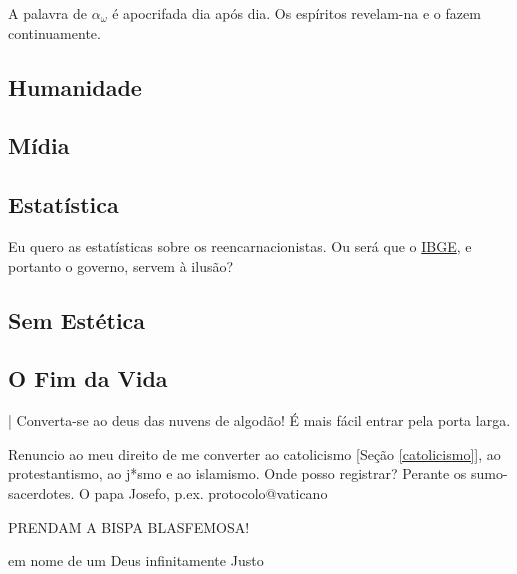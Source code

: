 \documentclass[12pt,a4paper]{article}
\begin{document}
			A palavra de $ \alpha_\omega $ \'e apocrifada dia ap\'os dia. Os esp\'iritos revelam-na e o fazem continuamente.

		\subsection{Humanidade}
			\begin{flushright}
			\end{flushright}

		\subsection{M\'idia}\label{midia}
			\begin{flushright}
			\end{flushright}

		\subsection{Estat\'istica}
			\begin{flushright}
			\end{flushright}

			Eu quero as estat\'isticas sobre os reencarnacionistas. Ou ser\'a que o \href{http://www.ibge.gov.br/}{IBGE}, e portanto o governo, servem \`a ilus\~ao?

		\subsection{Sem Est\'etica}
			\begin{flushright}
			\end{flushright}

		\subsection{O Fim da Vida}
			\begin{flushright}
			\end{flushright}

| Converta-se ao deus das nuvens de algod\~ao! \'E mais f\'acil entrar pela
porta larga.

			Renuncio ao meu direito de me converter ao catolicismo [Se\c{c}\~ao \ref{catolicismo}], ao protestantismo, ao j*smo e ao islamismo. Onde posso registrar? Perante os sumo-sacerdotes. O papa Josefo, p.ex. protocolo@vaticano

PRENDAM A BISPA BLASFEMOSA!

em nome de um Deus infinitamente Justo
\end{document}
